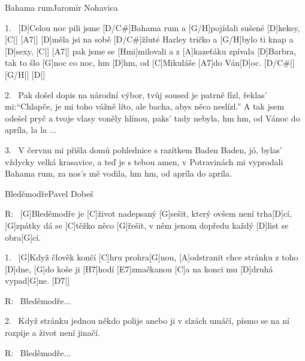 \begin{song}{Bahama rum}{Jaromír Nohavica}

\begin{xverse}{1.~}
[\large D]Celou noc pili jsme [\large D/C#]Bahama rum a [\large G/H]pojídali sušené [\large D]keksy, [\large C|]{} [\large A7|]{}
[\large D]měla jsi na sobě [\large D/C#]{žluté} Harley tričko a [\large G/H]bylo ti knap a [\large D]sexy, [\large C|]{} [\large A7|]{}
pak jsme se [\large Hmi]milovali a z [\large A]kazeťáku zpívala [\large D]Barbra,
tak to šlo [\large G]noc co noc, hm [\large D]hm, od [\large C]Mikuláše [\large A7]do Ván[\large D]oc. [\large D/C#|]{} [\large G/H|]{} [\large D|]{}
\end{xverse}

\begin{xverse}{2.~}
Pak došel dopis na národní výbor, tvůj soused je patrně fízl,
řeklas' mi:``Chlapče, je mi toho vážně líto,
ale bacha, abys něco neslízl.''
A tak jsem odešel pryč a tvoje vlasy voněly hlínou,
paks' tady nebyla, hm hm, od Vánoc do apríla, la la ...
\end{xverse}

\begin{xverse}{3.~}
V červnu mi přišla domů pohlednice s razítkem Baden Baden,
jó, bylas' vždycky velká krasavice, a teď je s tebou amen,
v Potravinách mi vyprodali Bahama rum,
za nos's mě vodila, hm hm, od apríla do apríla.
\end{xverse}

\end{song}



\begin{song}{Bleděmodře}{Pavel Dobeš}

\begin{xverse}{R:~}
[\large G]Bleděmodře je [\large C]{ži}vot nadepsaný [\large G]sešit,
který ovšem není trha[\large D]cí,
[\large G]zpátky dá se [\large C]těžko něco [\large G]{ře}šit,
v něm jenom dopředu každý [\large D]list se obra[\large G]cí.
\end{xverse}

\begin{xverse}{1.~}
[\large G]Když člověk končí [\large C]hru prohra[\large G]nou,
[\large A]odstranit chce stránku z toho [\large D]dne,
[\large G]do koše ji [\large H7]hodí [\large E7]zmačkanou
[\large C]a na konci mu [\large D]druhá vypad[\large G]ne. [\large D7|]{}
\end{xverse}

\begin{xverse}{R:~}
Bleděmodře...
\end{xverse}

\begin{xverse}{2.~}
Když stránku jednou někdo polije
anebo ji v slzách umáčí,
písmo se na ní rozpije
a život není jinačí.
\end{xverse}

\begin{xverse}{R:~}
Bleděmodře...
\end{xverse}

\end{song}


